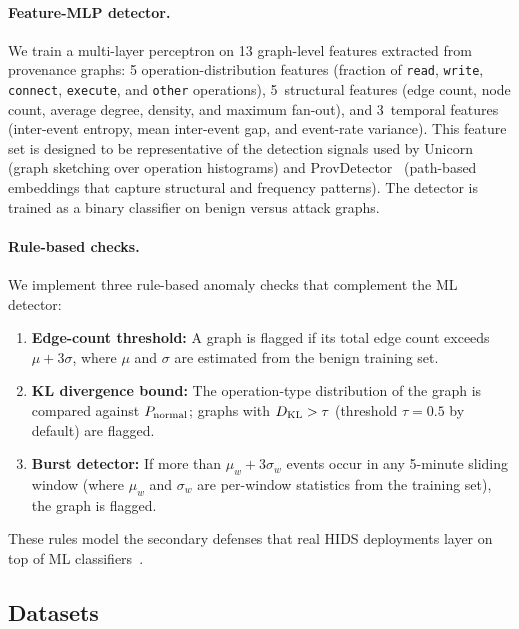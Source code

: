 \paragraph{Feature-MLP detector.}
We train a multi-layer perceptron on 13 graph-level features extracted
from provenance graphs: 5 operation-distribution features (fraction of
\texttt{read}, \texttt{write}, \texttt{connect}, \texttt{execute}, and
\texttt{other} operations), 5~structural features (edge count, node
count, average degree, density, and maximum fan-out), and 3~temporal
features (inter-event entropy, mean inter-event gap, and event-rate
variance). This feature set is designed to be representative of the
detection signals used by Unicorn~\cite{unicorn} (graph sketching over
operation histograms) and ProvDetector~\cite{provdetector} (path-based
embeddings that capture structural and frequency patterns). The detector
is trained as a binary classifier on benign versus attack graphs.

\paragraph{Rule-based checks.}
We implement three rule-based anomaly checks that complement the ML
detector:
\begin{enumerate}
  \item \textbf{Edge-count threshold:} A graph is flagged if its total
        edge count exceeds $\mu + 3\sigma$, where $\mu$ and $\sigma$
        are estimated from the benign training set.
  \item \textbf{KL divergence bound:} The operation-type distribution
        of the graph is compared against $P_{\text{normal}}$; graphs with
        $D_{\text{KL}} > \tau$ (threshold $\tau = 0.5$ by default) are flagged.
  \item \textbf{Burst detector:} If more than $\mu_w + 3\sigma_w$
        events occur in any 5-minute sliding window (where $\mu_w$
        and $\sigma_w$ are per-window statistics from the training
        set), the graph is flagged.
\end{enumerate}
These rules model the secondary defenses that real HIDS deployments
layer on top of ML classifiers~\cite{unicorn,shadewatcher}.

\subsection{Datasets}
\label{sec:datasets}


